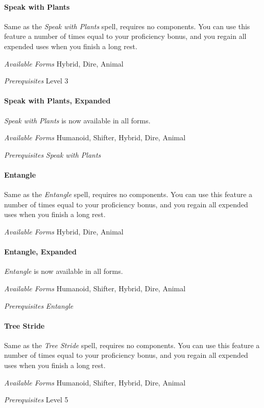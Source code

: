 \documentclass[twocolumn]{dndbook}
\begin{document}
\paragraph*{Speak with Plants}
Same as the \emph{Speak with Plants} spell, requires no components.
You can use this feature a number of times equal to your proficiency bonus, and you regain all expended uses when you finish a long rest.\par
\emph{Available Forms} Hybrid, Dire, Animal\par
\emph{Prerequisites} Level 3\par

\paragraph*{Speak with Plants, Expanded}
\emph{Speak with Plants} is now available in all forms.\par
\emph{Available Forms} Humanoid, Shifter, Hybrid, Dire, Animal\par
\emph{Prerequisites} \emph{Speak with Plants}\par

\paragraph*{Entangle}
Same as the \emph{Entangle} spell, requires no components.
You can use this feature a number of times equal to your proficiency bonus, and you regain all expended uses when you finish a long rest.\par
\emph{Available Forms} Hybrid, Dire, Animal\par

\paragraph*{Entangle, Expanded}
\emph{Entangle} is now available in all forms.\par
\emph{Available Forms} Humanoid, Shifter, Hybrid, Dire, Animal\par
\emph{Prerequisites} \emph{Entangle}\par

\paragraph*{Tree Stride}
Same as the \emph{Tree Stride} spell, requires no components.
You can use this feature a number of times equal to your proficiency bonus, and you regain all expended uses when you finish a long rest.\par
\emph{Available Forms} Humanoid, Shifter, Hybrid, Dire, Animal\par
\emph{Prerequisites} Level 5\par
\end{document}
